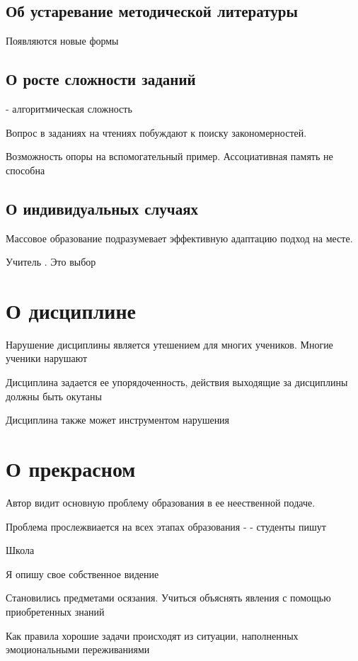 \subsection{Об устаревание методической литературы}

Появляются новые формы

\subsection{О росте сложности заданий}

- алгоритмическая сложность 

Вопрос в заданиях на чтениях побуждают к поиску закономерностей.


Возможность опоры на вспомогательный пример. Ассоциативная память не способна

\subsection{О индивидуальных случаях}

Массовое образование подразумевает эффективную адаптацию подход на месте.

Учитель .
Это выбор

\section{О дисциплине}

Нарушение дисциплины является утешением для многих учеников. Многие ученики нарушают 

Дисциплина задается ее упорядоченность, действия выходящие за дисциплины должны быть окутаны 

Дисциплина также может инструментом нарушения


\section{О прекрасном}

Автор видит основную проблему образования в ее неественной подаче.

Проблема прослежвиается на всех этапах образования
- 
- студенты пишут 

Школа 

Я опишу свое собственное видение

Становились предметами осязания. Учиться объяснять явления с помощью приобретенных знаний

Как правила хорошие задачи происходят из ситуации, наполненных эмоциональными переживаниями

